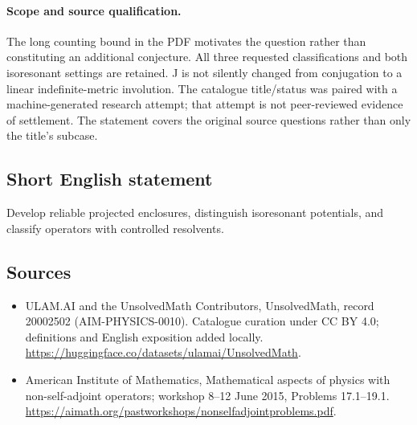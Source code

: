 \documentclass[11pt]{article}
\begin{document}
\paragraph{Scope and source qualification.}The long counting bound in the PDF motivates the question rather than constituting an additional conjecture. All three requested classifications and both isoresonant settings are retained. J is not silently changed from conjugation to a linear indefinite-metric involution. The catalogue title/status was paired with a machine-generated research attempt; that attempt is not peer-reviewed evidence of settlement. The statement covers the original source questions rather than only the title’s subcase.
\subsection{Short English statement}
Develop reliable projected enclosures, distinguish isoresonant potentials, and classify operators with controlled resolvents.
\subsection{Sources}
\begin{itemize}
\item[\hypertarget{source:20002502:1}{S1}] ULAM.AI and the UnsolvedMath Contributors, UnsolvedMath, record 20002502 (AIM-PHYSICS-0010). Catalogue curation under CC BY 4.0; definitions and English exposition added locally.
\url{https://huggingface.co/datasets/ulamai/UnsolvedMath}.
\item[\hypertarget{source:20002502:2}{S2}] American Institute of Mathematics, Mathematical aspects of physics with non-self-adjoint operators; workshop 8–12 June 2015, Problems 17.1–19.1.
\url{https://aimath.org/pastworkshops/nonselfadjointproblems.pdf}.
\end{itemize}
\label{end:20002502}
\end{document}
